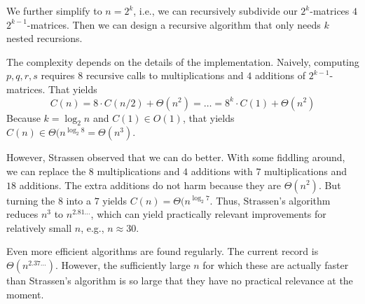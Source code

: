 We further simplify to $n=2^k$, i.e., we can recursively subdivide our $2^k$-matrices $4$ $2^{k-1}$-matrices.
Then we can design a recursive algorithm that only needs $k$ nested recursions.

The complexity depends on the details of the implementation.
Naively, computing $p,q,r,s$ requires $8$ recursive calls to multiplications and $4$ additions of $2^{k-1}$-matrices.
That yields
 \[C(n)=8\cdot C(n/2) + \Theta(n^2) = \ldots = 8^k\cdot C(1)+\Theta(n^2)\]
Because $k=\log_2 n$ and $C(1)\in O(1)$, that yields $C(n)\in\Theta(n^{\log_2 8}=\Theta(n^3)$.

However, Strassen observed that we can do better.
With some fiddling around, we can replace the $8$ multiplications and $4$ additions with $7$ multiplications and $18$ additions.
The extra additions do not harm because they are $\Theta(n^2)$.
But turning the $8$ into a $7$ yields $C(n)=\Theta(n^{\log_2 7}$.
Thus, Strassen's algorithm reduces $n^3$ to $n^{2.81\ldots}$, which can yield practically relevant improvements for relatively small $n$, e.g., $n\approx 30$.
\medskip

Even more efficient algorithms are found regularly.
The current record is $\Theta(n^{2.37\ldots})$.
However, the sufficiently large $n$ for which these are actually faster than Strassen's algorithm is so large that they have no practical relevance at the moment.

